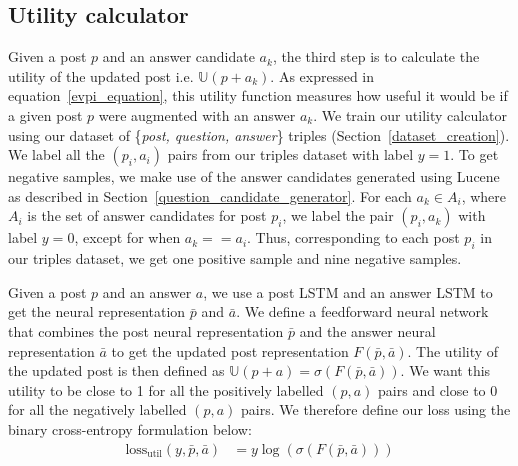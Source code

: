 \documentclass[11pt]{report}
\newcommand{\U}{\mathbb{U}}
\begin{document}
\subsection{Utility calculator}\label{utility_calculator}
Given a post $p$ and an answer candidate $a_k$, the third step is to calculate the utility of the updated post i.e. $\U(p + a_k)$. As expressed in equation~\ref{evpi_equation}, this utility function measures how useful it would be if a given post $p$ were augmented with an answer $a_k$. We train our utility calculator using our dataset of \{\textit{post, question, answer}\} triples (Section~\ref{dataset_creation}). We label all the $(p_i, a_i)$ pairs from our triples dataset with label $y=1$. To get negative samples, we make use of the answer candidates generated using Lucene as described in Section~\ref{question_candidate_generator}. For each $a_k \in A_i$, where $A_i$ is the set of answer candidates for post $p_i$, we label the pair $(p_i, a_k)$ with label $y=0$, except for when $a_k == a_i$. Thus, corresponding to each post $p_i$ in our triples dataset, we get one positive sample and nine negative samples. 

Given a post $p$ and an answer $a$, we use a post LSTM and an answer LSTM to get the neural representation $\bar{p}$ and $\bar{a}$. We define a feedforward neural network that combines the post neural representation $\bar{p}$ and the answer neural representation $\bar{a}$ to get the updated post representation $F(\bar{p}, \bar{a})$. The utility of the updated post is then defined as $\U(p+a) = \sigma ( F(\bar{p}, \bar{a}) )$. We want this utility to be close to 1 for all the positively labelled $(p,a)$ pairs and close to 0 for all the negatively labelled $(p, a)$ pairs. We therefore define our loss using the binary cross-entropy formulation below:
%
\begin{align}\label{eq_utility_calculator}
  \textrm{loss}_{\textrm{util}}(y, \bar p, \bar a) &= y \log(\sigma (F(\bar{p}, \bar{a})))
\end{align}
\end{document}
